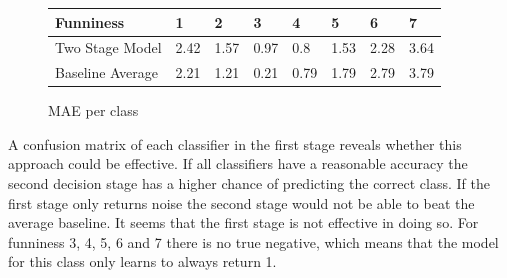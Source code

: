 \documentclass[draft,final,oneside]{vutinfth} %
\begin{document}
\begin{figure}
\centering
\begin{tabular}{|l|l|l|l|l|l|l|l|} 
\hline
\textbf{Funniness} 	& \textbf{1}	& \textbf{2}	& \textbf{3}	& \textbf{4}	& \textbf{5}	& \textbf{6}	& \textbf{7}  \\ 
\hline
Two Stage Model     & 2.42			&  1.57			& 0.97			& 0.8			& 1.53			& 2.28			& 3.64   \\
Baseline Average    & 2.21			& 1.21			& 0.21			& 0.79			& 1.79			& 2.79			& 3.79 \\	
\hline
\end{tabular}
\caption{MAE per class}
\label{twostagemae}
\end{figure}

A confusion matrix of each classifier in the first stage reveals whether this approach could be effective. If all classifiers have a reasonable accuracy the second decision stage has a higher chance of predicting the correct class. If the first stage only returns noise the second stage would not be able to beat the average baseline. It seems that the first stage is not effective in doing so. For funniness 3, 4, 5, 6 and 7 there is no true negative, which means that the model for this class only learns to always return 1.
\end{document}
